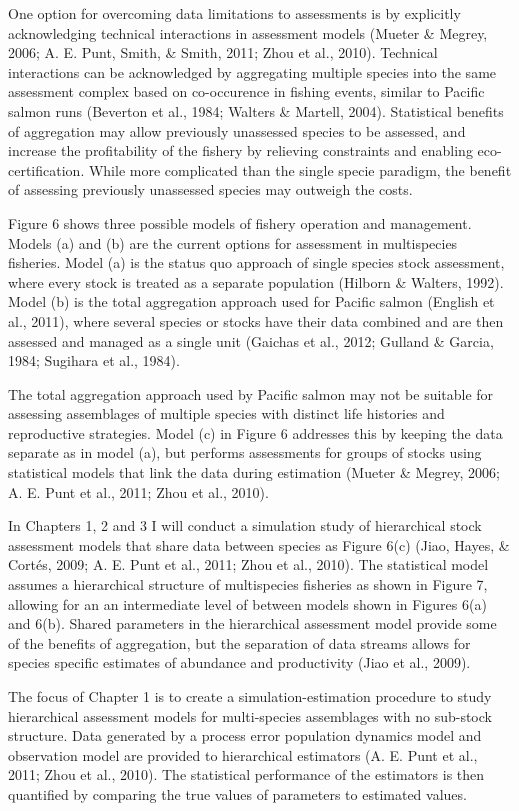 \documentclass[12pt,]{scrartcl}
\begin{document}
One option for overcoming data limitations to assessments is by
explicitly acknowledging technical interactions in assessment models
(Mueter \& Megrey, 2006; A. E. Punt, Smith, \& Smith, 2011; Zhou et al.,
2010). Technical interactions can be acknowledged by aggregating
multiple species into the same assessment complex based on co-occurence
in fishing events, similar to Pacific salmon runs (Beverton et al.,
1984; Walters \& Martell, 2004). Statistical benefits of aggregation may
allow previously unassessed species to be assessed, and increase the
profitability of the fishery by relieving constraints and enabling
eco-certification. While more complicated than the single specie
paradigm, the benefit of assessing previously unassessed species may
outweigh the costs.

Figure 6 shows three possible models of fishery operation and
management. Models (a) and (b) are the current options for assessment in
multispecies fisheries. Model (a) is the status quo approach of single
species stock assessment, where every stock is treated as a separate
population (Hilborn \& Walters, 1992). Model (b) is the total
aggregation approach used for Pacific salmon (English et al., 2011),
where several species or stocks have their data combined and are then
assessed and managed as a single unit (Gaichas et al., 2012; Gulland \&
Garcia, 1984; Sugihara et al., 1984).

The total aggregation approach used by Pacific salmon may not be
suitable for assessing assemblages of multiple species with distinct
life histories and reproductive strategies. Model (c) in Figure 6
addresses this by keeping the data separate as in model (a), but
performs assessments for groups of stocks using statistical models that
link the data during estimation (Mueter \& Megrey, 2006; A. E. Punt et
al., 2011; Zhou et al., 2010).

In Chapters 1, 2 and 3 I will conduct a simulation study of hierarchical
stock assessment models that share data between species as Figure 6(c)
(Jiao, Hayes, \& Cortés, 2009; A. E. Punt et al., 2011; Zhou et al.,
2010). The statistical model assumes a hierarchical structure of
multispecies fisheries as shown in Figure 7, allowing for an an
intermediate level of between models shown in Figures 6(a) and 6(b).
Shared parameters in the hierarchical assessment model provide some of
the benefits of aggregation, but the separation of data streams allows
for species specific estimates of abundance and productivity (Jiao et
al., 2009).

The focus of Chapter 1 is to create a simulation-estimation procedure to
study hierarchical assessment models for multi-species assemblages with
no sub-stock structure. Data generated by a process error population
dynamics model and observation model are provided to hierarchical
estimators (A. E. Punt et al., 2011; Zhou et al., 2010). The statistical
performance of the estimators is then quantified by comparing the true
values of parameters to estimated values.
\end{document}
